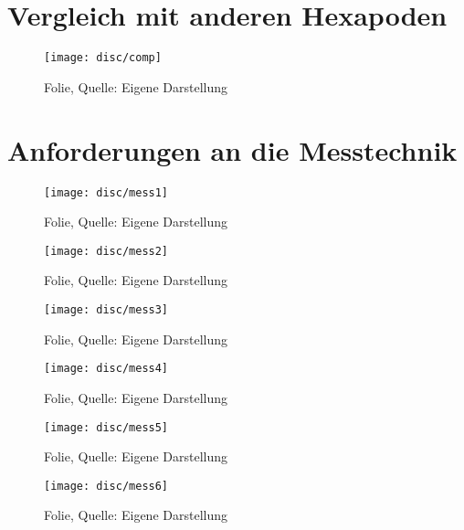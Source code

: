 \thispagestyle{scrheadings}
\section{Vergleich mit anderen Hexapoden}
\label{disc-comp}

\begin{figure}[H]
    \centering
    \texttt{[image: disc/comp]}
    \caption[Folie]{Folie, Quelle: Eigene Darstellung}
    \label{fig:comp}
\end{figure}

\thispagestyle{scrheadings}
\section{Anforderungen an die Messtechnik}
\label{disc-mess}

\begin{figure}[H]
    \centering
    \texttt{[image: disc/mess1]}
    \caption[Folie]{Folie, Quelle: Eigene Darstellung}
    \label{fig:mess1}
\end{figure}

\begin{figure}[H]
    \centering
    \texttt{[image: disc/mess2]}
    \caption[Folie]{Folie, Quelle: Eigene Darstellung}
    \label{fig:mess2}
\end{figure}

\begin{figure}[H]
    \centering
    \texttt{[image: disc/mess3]}
    \caption[Folie]{Folie, Quelle: Eigene Darstellung}
    \label{fig:mess3}
\end{figure}

\begin{figure}[H]
    \centering
    \texttt{[image: disc/mess4]}
    \caption[Folie]{Folie, Quelle: Eigene Darstellung}
    \label{fig:mess4}
\end{figure}

\begin{figure}[H]
    \centering
    \texttt{[image: disc/mess5]}
    \caption[Folie]{Folie, Quelle: Eigene Darstellung}
    \label{fig:mess5}
\end{figure}

\begin{figure}[H]
    \centering
    \texttt{[image: disc/mess6]}
    \caption[Folie]{Folie, Quelle: Eigene Darstellung}
    \label{fig:mess6}
\end{figure}

